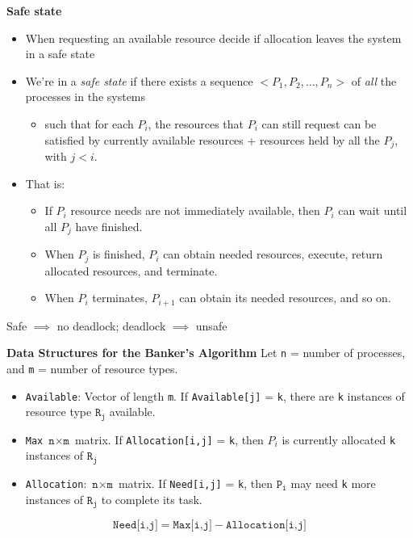 \documentclass[11pt,a4paper]{article}
\begin{document}
\textbf{Safe state}
\begin{itemize}
    \item When requesting an available resource decide if allocation leaves the system in a
        safe state
    \item We're in a \emph{safe state} if there exists a sequence $<P_1, P_2, \ldots, P_n>$
        of \emph{all} the processes in the systems
        \begin{itemize}
            \item such that for each $P_i$, the resources that $P_i$ can still request can be
                satisfied by currently available resources + resources held by all the $P_j$,
                with $j < i$.
        \end{itemize}
    \item That is:
        \begin{itemize}
            \item If $P_i$ resource needs are not immediately available, then $P_i$
                can wait until all $P_j$ have finished.
            \item When $P_j$ is finished, $P_i$ can obtain needed resources, execute, return
                allocated resources, and terminate.
            \item When $P_i$ terminates, $P_{i+1}$ can obtain its needed resources, and so on.
        \end{itemize}
\end{itemize}
Safe $\implies$ no deadlock; \quad deadlock $\implies$ unsafe

\textbf{Data Structures for the Banker's Algorithm}
Let \texttt{n} = number of processes, and \texttt{m} = number of resource types.
\begin{itemize}
    \item \texttt{Available}: Vector of length \texttt{m}.
        If \texttt{Available[j]} = \texttt{k}, there are \texttt{k} instances of resource type
        $\texttt{R}_\texttt{j}$ available.
    \item \texttt{Max} $\texttt{n} \times \texttt{m}$ matrix.
        If \texttt{Allocation[i,j]} = \texttt{k}, then $P_i$ is currently allocated
        \texttt{k} instances of $\texttt{R}_\texttt{j}$
    \item \texttt{Allocation}: $\texttt{n} \times \texttt{m}$ matrix.
        If \texttt{Need[i,j]} = \texttt{k}, then $\texttt{P}_\texttt{i}$ may need \texttt{k}
        more instances of $\texttt{R}_\texttt{j}$ to complete its task.
\end{itemize}
\[
    \texttt{Need[i,j]} = \texttt{Max[i,j]} - \texttt{Allocation[i,j]}
\]
\end{document}

